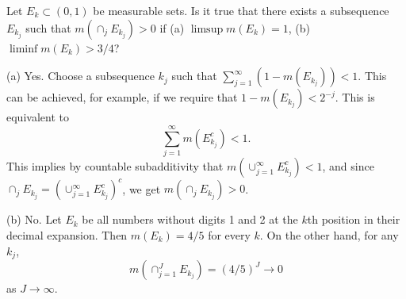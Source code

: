   \begin{exercise}
    Let $E_{k}\subset(0,1)$ be measurable sets. Is it true that there exists a subsequence $E_{k_{j}}$ such that $m(\cap_{j}E_{k_{j}})>0$ if (a) $\limsup m(E_{k})=1$, (b) $\liminf m(E_{k})>3/4$?
  \end{exercise}
  \begin{solution}
    (a) Yes. Choose a subsequence $k_{j}$ such that $\sum_{j=1}^{\infty}(1-m(E_{k_{j}}))<1$. This can be achieved, for example, if we require that $1-m(E_{k_{j}})<2^{-j}$. This is equivalent to
    \begin{equation}
      \sum_{j=1}^{\infty}m(E_{k_{j}}^{c})<1.
    \end{equation}
    This implies by countable subadditivity that $m(\cup_{j=1}^{\infty}E_{k_{j}}^{c})<1$, and since $\cap_{j}E_{k_{j}}=(\cup_{j=1}^{\infty}E_{k_{j}}^{c})^{c}$, we get $m(\cap_{j}E_{k_{j}})>0$.

    (b) No. Let $E_{k}$ be all numbers without digits 1 and 2 at the $k$th position in their decimal expansion. Then $m(E_{k})=4/5$ for every $k$. On the other hand, for any $k_{j}$,
    \begin{equation}
      m(\cap_{j=1}^{J}E_{k_{j}})=(4/5)^{J}\rightarrow0
    \end{equation}
    as $J\rightarrow\infty$.
  \end{solution}

